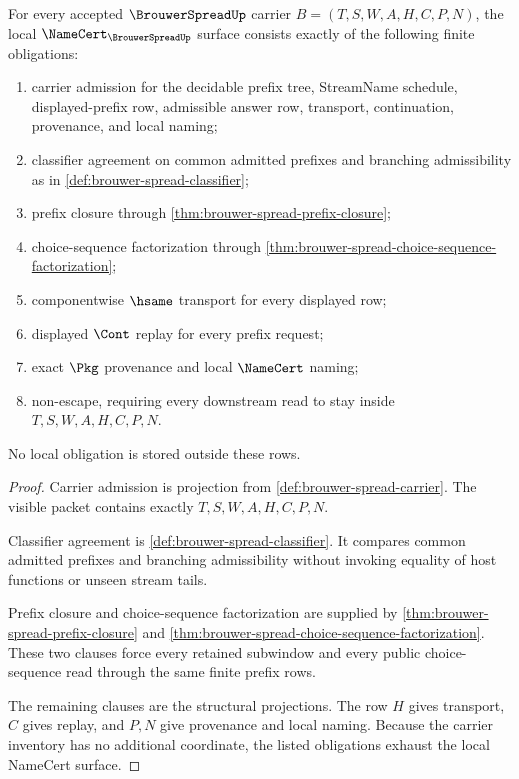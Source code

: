 \begin{theorem}
\label{thm:brouwer-spread-namecert-obligation-surface}
For every accepted $\BrouwerSpreadUp$ carrier $B=(T,S,W,A,H,C,P,N)$, the local $\NameCert_{\BrouwerSpreadUp}$ surface consists exactly of the following finite obligations:
\begin{enumerate}
\item carrier admission for the decidable prefix tree, StreamName schedule, displayed-prefix row, admissible answer row, transport, continuation, provenance, and local naming;
\item classifier agreement on common admitted prefixes and branching admissibility as in \autoref{def:brouwer-spread-classifier};
\item prefix closure through \autoref{thm:brouwer-spread-prefix-closure};
\item choice-sequence factorization through \autoref{thm:brouwer-spread-choice-sequence-factorization};
\item componentwise $\hsame$ transport for every displayed row;
\item displayed $\Cont$ replay for every prefix request;
\item exact $\Pkg$ provenance and local $\NameCert$ naming;
\item non-escape, requiring every downstream read to stay inside $T,S,W,A,H,C,P,N$.
\end{enumerate}
No local obligation is stored outside these rows.
\end{theorem}
\begin{proof}
Carrier admission is projection from \autoref{def:brouwer-spread-carrier}. The visible packet contains exactly $T,S,W,A,H,C,P,N$.

Classifier agreement is \autoref{def:brouwer-spread-classifier}. It compares common admitted prefixes and branching admissibility without invoking equality of host functions or unseen stream tails.

Prefix closure and choice-sequence factorization are supplied by \autoref{thm:brouwer-spread-prefix-closure} and \autoref{thm:brouwer-spread-choice-sequence-factorization}. These two clauses force every retained subwindow and every public choice-sequence read through the same finite prefix rows.

The remaining clauses are the structural projections. The row $H$ gives transport, $C$ gives replay, and $P,N$ give provenance and local naming. Because the carrier inventory has no additional coordinate, the listed obligations exhaust the local NameCert surface.
\end{proof}

